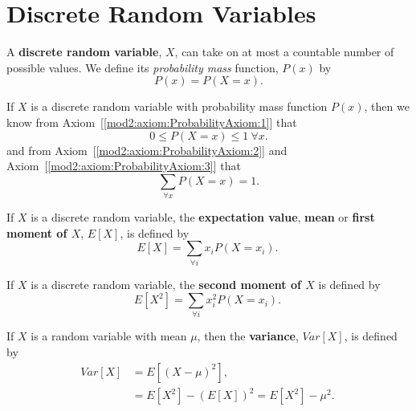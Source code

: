 \section{Discrete Random Variables} \label{mod2:section:DiscreteRandomVariables}


\begin{defn} \label{mod2:defn:DiscreteRandomVar}
	A \textbf{discrete random variable}, $X$, can take on at most a countable number of possible values. We define its \textit{probability mass} function, $P(x)$ by
	\begin{equation}
	P(x) =P(X = x).
	\end{equation}
\end{defn}

\begin{prop}\label{mod2:prop:Discrete:Properties}
	If $X$ is a discrete random variable with probability mass function $P(x)$, then we know from Axiom~[\ref{mod2:axiom:ProbabilityAxiom:1}] that
	\begin{equation}
	0 \leq P(X=x) \leq 1 \: \forall x.
	\end{equation}
	and from Axiom~[\ref{mod2:axiom:ProbabilityAxiom:2}] and Axiom~[\ref{mod2:axiom:ProbabilityAxiom:3}] that
	\begin{equation}
	\sum_{\forall x}P(X=x) = 1 .
	\end{equation}
\end{prop}

\begin{defn} \label{mod2:defn:Discrete:Expectation}
	If $X$ is a discrete random variable, the \textbf{expectation value}, \textbf{mean} or \textbf{first moment of $X$}, $E[X]$, is defined by
	\begin{equation}
	E[X]= \sum_{\forall i} x_i P(X=x_i). \label{mod2:eq:Discrete:Expectation}\ 
	\end{equation}
\end{defn}

\begin{defn} \label{mod2:defn:Discrete:SecondMoment}
	If $X$ is a discrete random variable, the \textbf{second moment of $X$} is defined by
	\begin{equation}
	E[X^2] = \sum_{\forall i} x_i^2 P(X=x_i). \label{mod2:eq:Discrete:SecondMoment} \ 
	\end{equation}
\end{defn}

\begin{defn}\label{mod2:defn:Discrete:Variance}
	If $X$ is a random variable with mean $\mu$, then the \textbf{variance}, $Var[X]$, is defined by
	\begin{align}
	Var[X] &= E[(X-\mu)^2],  \label{mod2:eq:Discrete:Variance:1}  \\
	&= E[X^2] - (E[X])^2  = E[X^2] - \mu^2 . \label{mod2:eq:Discrete:Variance:2} \
	\end{align}
\end{defn}



